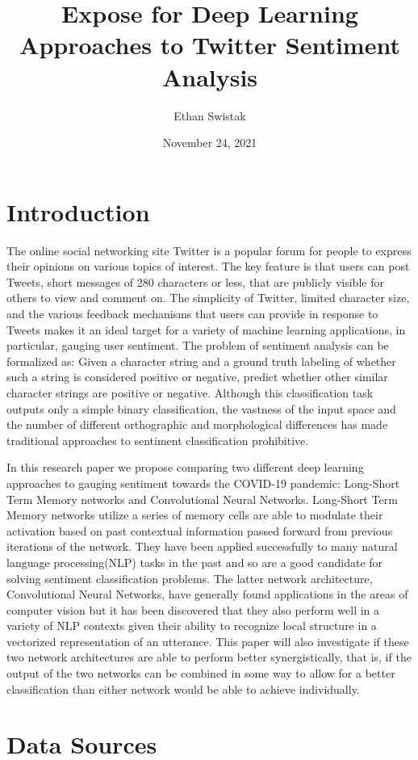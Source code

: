 \documentclass{article}
\title{Expose for Deep Learning Approaches to Twitter Sentiment Analysis}
\author{Ethan Swistak}
\date{November 24, 2021}
\begin{document}
\maketitle

\section{Introduction}
The online social networking site Twitter is a popular forum for people to express their opinions on various topics of interest. The key feature is that users can post Tweets, short messages of 280 characters or less, that are publicly visible for others to view and comment on. The simplicity of Twitter, limited character size, and the various feedback mechanisms that users can provide in response to Tweets makes it an ideal target for a variety of machine learning applications, in particular, gauging user sentiment. The problem of sentiment analysis can be formalized as: Given a character string and a ground truth labeling of whether such a string is considered positive or negative, predict whether other similar character strings are positive or negative. Although this classification task outputs only a simple binary classification, the vastness of the input space and the number of different orthographic and morphological differences  has made traditional approaches to sentiment classification prohibitive. 

In this research paper we propose comparing two different deep learning approaches to gauging sentiment towards the COVID-19 pandemic: Long-Short Term Memory networks and Convolutional Neural Networks. Long-Short Term Memory networks utilize a series of memory cells are able to modulate their activation based on past contextual information passed forward from previous iterations of the network. They have been applied successfully to many natural language processing(NLP) tasks in the past and so are a good candidate for solving sentiment classification problems. The latter network architecture, Convolutional Neural Networks, have generally found applications in the areas of computer vision but it has been discovered that they also perform well in a variety of NLP contexts given their ability to recognize local structure in a vectorized representation of an utterance. This paper will also investigate if these two network architectures are able to perform better synergistically, that is, if the output of the two networks can be combined in some way to allow for a better classification than either network would be able to achieve individually.


\section{Data Sources}
\end{document}
